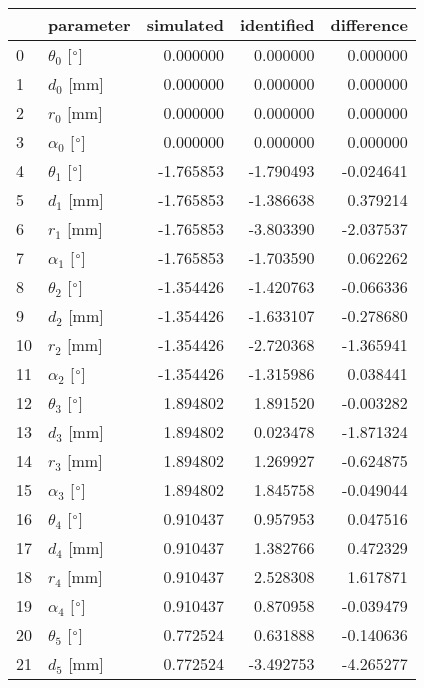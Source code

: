 \documentclass{standalone}%
\begin{document}
%
\normalsize%
\begin{tabular}{llrrr}
\toprule
{} &                 parameter & simulated & identified & difference \\
\midrule
0  &  $\theta_{0}$ [$\degree$] &  0.000000 &   0.000000 &   0.000000 \\
1  &              $d_{0}$ [mm] &  0.000000 &   0.000000 &   0.000000 \\
2  &              $r_{0}$ [mm] &  0.000000 &   0.000000 &   0.000000 \\
3  &  $\alpha_{0}$ [$\degree$] &  0.000000 &   0.000000 &   0.000000 \\
4  &  $\theta_{1}$ [$\degree$] & -1.765853 &  -1.790493 &  -0.024641 \\
5  &              $d_{1}$ [mm] & -1.765853 &  -1.386638 &   0.379214 \\
6  &              $r_{1}$ [mm] & -1.765853 &  -3.803390 &  -2.037537 \\
7  &  $\alpha_{1}$ [$\degree$] & -1.765853 &  -1.703590 &   0.062262 \\
8  &  $\theta_{2}$ [$\degree$] & -1.354426 &  -1.420763 &  -0.066336 \\
9  &              $d_{2}$ [mm] & -1.354426 &  -1.633107 &  -0.278680 \\
10 &              $r_{2}$ [mm] & -1.354426 &  -2.720368 &  -1.365941 \\
11 &  $\alpha_{2}$ [$\degree$] & -1.354426 &  -1.315986 &   0.038441 \\
12 &  $\theta_{3}$ [$\degree$] &  1.894802 &   1.891520 &  -0.003282 \\
13 &              $d_{3}$ [mm] &  1.894802 &   0.023478 &  -1.871324 \\
14 &              $r_{3}$ [mm] &  1.894802 &   1.269927 &  -0.624875 \\
15 &  $\alpha_{3}$ [$\degree$] &  1.894802 &   1.845758 &  -0.049044 \\
16 &  $\theta_{4}$ [$\degree$] &  0.910437 &   0.957953 &   0.047516 \\
17 &              $d_{4}$ [mm] &  0.910437 &   1.382766 &   0.472329 \\
18 &              $r_{4}$ [mm] &  0.910437 &   2.528308 &   1.617871 \\
19 &  $\alpha_{4}$ [$\degree$] &  0.910437 &   0.870958 &  -0.039479 \\
20 &  $\theta_{5}$ [$\degree$] &  0.772524 &   0.631888 &  -0.140636 \\
21 &              $d_{5}$ [mm] &  0.772524 &  -3.492753 &  -4.265277 \\

\end{tabular}
\end{document}
